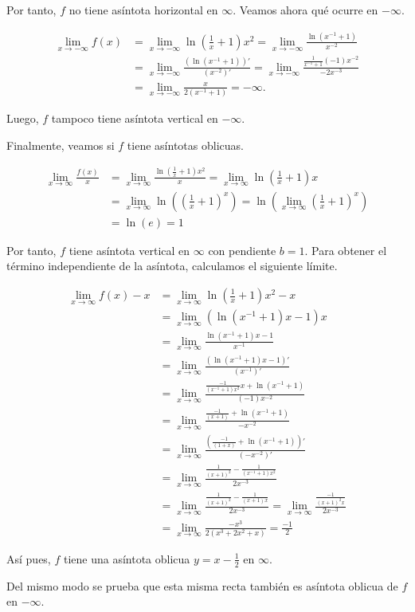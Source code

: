 \documentclass[
  a4paper,
]{scrreport}
\theoremstyle{definition}
\theoremstyle{remark}
\begin{document}
\begin{tcolorbox}
Por tanto, \(f\) no tiene asíntota horizontal en \(\infty\). Veamos
ahora qué ocurre en \(-\infty\).

\begin{align*}
\lim_{x\to -\infty} f(x) &= \lim_{x\to -\infty}\ln\left(\frac{1}{x}+1\right)x^2 = \lim_{x\to -\infty} \frac{\ln(x^{-1}+1)}{x^{-2}}\\ 
&= \lim_{x\to -\infty} \frac{(\ln(x^{-1}+1))'}{(x^{-2})'} \tag{L'Hôpital} = \lim_{x\to -\infty} \frac{\frac{1}{x^{-1}+1}(-1)x^{-2}}{-2x^{-3}}\\ 
&= \lim_{x\to -\infty} \frac{x}{2(x^{-1}+1)} = -\infty.
\end{align*}

Luego, \(f\) tampoco tiene asíntota vertical en \(-\infty\).

Finalmente, veamos si \(f\) tiene asíntotas oblicuas.

\begin{align*}
\lim_{x\to \infty} \frac{f(x)}{x} &= \lim_{x\to \infty}\frac{\ln\left(\frac{1}{x}+1\right)x^2}{x} = \lim_{x\to \infty}\ln\left(\frac{1}{x}+1\right)x \\
&= \lim_{x\to \infty} \ln\left(\left(\frac{1}{x}+1\right)^x\right) = \ln\left(\lim_{x\to \infty} \left(\frac{1}{x}+1\right)^x\right)\\ 
&= \ln(e)=1
\end{align*}

Por tanto, \(f\) tiene asíntota vertical en \(\infty\) con pendiente
\(b=1\). Para obtener el término independiente de la asíntota,
calculamos el siguiente límite.

\begin{align*}
\lim_{x\to \infty} f(x)-x &= \lim_{x\to \infty}\ln\left(\frac{1}{x}+1\right)x^2-x\\  
&= \lim_{x\to \infty}(\ln(x^{-1}+1)x-1)x \\
&= \lim_{x\to \infty}\frac{\ln(x^{-1}+1)x-1}{x^{-1}}\\  
&=  \lim_{x\to \infty}\frac{(\ln(x^{-1}+1)x-1)'}{(x^{-1})'} \tag{L'Hôpital} \\
&= \lim_{x\to \infty}\frac{\frac{-1}{(x^{-1}+1)x^2}x+\ln(x^{-1}+1)}{(-1)x^{-2}}\\ 
&= \lim_{x\to \infty}\frac{\frac{-1}{(x+1)}+\ln(x^{-1}+1)}{-x^{-2}} \\
&= \lim_{x\to \infty}\frac{\left(\frac{-1}{(1+x)}+\ln(x^{-1}+1)\right)'}{(-x^{-2})'}\\ 
&= \lim_{x\to \infty}\frac{\frac{1}{(x+1)^2}-\frac{1}{(x^{-1}+1)x^2}}{2x^{-3}}\tag{L'Hôpital}\\ 
&= \lim_{x\to \infty}\frac{\frac{1}{(x+1)^2}-\frac{1}{(x+1)x}}{2x^{-3}} = \lim_{x\to \infty}\frac{\frac{-1}{(x+1)^2x}}{2x^{-3}} \\
&= \lim_{x\to \infty}\frac{-x^3}{2(x^3+2x^2+x)} = \frac{-1}{2}
\end{align*}

Así pues, \(f\) tiene una asíntota oblicua \(y=x-\frac{1}{2}\) en
\(\infty\).

Del mismo modo se prueba que esta misma recta también es asíntota
oblicua de \(f\) en \(-\infty\).

\end{tcolorbox}
\end{document}
